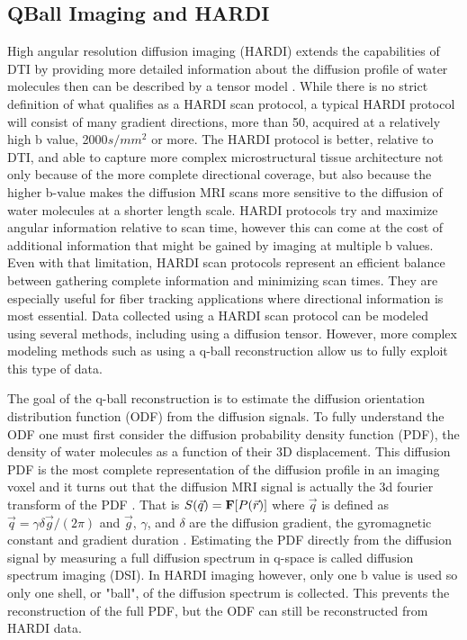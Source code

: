 \subsection{QBall Imaging and HARDI}
    High angular resolution diffusion imaging (HARDI) extends the capabilities of DTI by providing more detailed information about the diffusion profile of water molecules then can be described by a tensor model \cite{Tuch_2002}. While there is no strict definition of what qualifies as a HARDI scan protocol, a typical HARDI protocol will consist of many gradient directions, more than 50, acquired at a relatively high b value, 2000$s/mm^2$ or more. The HARDI protocol is better, relative to DTI, and able to capture more complex microstructural tissue architecture not only because of the more complete directional coverage, but also because the higher b-value makes the diffusion MRI scans more sensitive to the diffusion of water molecules at a shorter length scale. HARDI protocols try and maximize angular information relative to scan time, however this can come at the cost of additional information that might be gained by imaging at multiple b values. Even with that limitation, HARDI scan protocols represent an efficient balance between gathering complete information and minimizing scan times. They are especially useful for fiber tracking applications where directional information is most essential. Data collected using a HARDI scan protocol can be modeled using several methods, including using a diffusion tensor. However, more complex modeling methods such as using a q-ball reconstruction allow us to fully exploit this type of data.
    
    The goal of the q-ball reconstruction is to estimate the diffusion orientation distribution function (ODF) from the diffusion signals. To fully understand the ODF one must first consider the diffusion probability density function (PDF), the density of water molecules as a function of their 3D displacement. This diffusion PDF is the most complete representation of the diffusion profile in an imaging voxel and it turns out that the diffusion MRI signal is actually the 3d fourier transform of the PDF \cite{Wedeen_2005, Wedeen_2008}. That is $S(\vec{q}) = \bold{F}[P(\vec{r})]$ where $\vec{q}$ is defined as $\vec{q} = \gamma\delta\vec{g}/(2\pi)$ and $\vec{g}$, $\gamma$, and $\delta$ are the diffusion gradient, the gyromagnetic constant and gradient duration \cite{Tuch_2004}. Estimating the PDF directly from the diffusion signal by measuring a full diffusion spectrum in q-space is called diffusion spectrum imaging (DSI). In HARDI imaging however, only one b value is used so only one shell, or "ball", of the diffusion spectrum is collected. This prevents the reconstruction of the full PDF, but the ODF can still be reconstructed from HARDI data.
    
